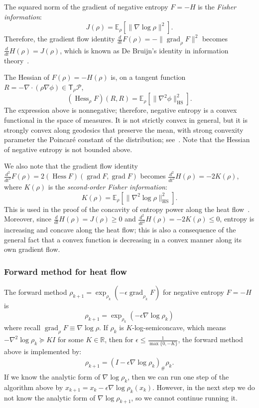 \documentclass[final,12pt]{colt2018}
\newcommand{\R}{\mathbb{R}}
\newcommand{\E}{\mathbb{E}}
\newcommand{\HS}{\mathrm{HS}}
\DeclareMathOperator{\grad}{grad}
\DeclareMathOperator{\Hess}{Hess}
\newcommand{\T}{\mathsf{T}}
\renewcommand{\P}{\mathcal{P}}
\begin{document}
The squared norm of the gradient of negative entropy $F = -H$ is the {\em Fisher information}:
$$J(\rho) = \E_\rho[\|\nabla \log \rho\|^2].$$
Therefore, the gradient flow identity $\frac{d}{dt} F(\rho) = -\|\grad_\rho F\|^2$ becomes $\frac{d}{dt} H(\rho) = J(\rho)$, which is known as De Bruijn's identity in information theory~\cite[]{Sta59}.

The Hessian of $F(\rho) = -H(\rho)$ is, on a tangent function $R = -\nabla \cdot(\rho \nabla \phi) \in \T_\rho \P$,
$$(\Hess_\rho F)(R,R) = \E_\rho[\|\nabla^2 \phi\|^2_{\HS}].$$
The expression above is nonnegative; therefore, negative entropy is a convex functional in the space of measures.
It is not strictly convex in general,
but it is strongly convex along geodesics that preserve the mean, with strong convexity parameter the Poincar\'e constant of the distribution; see~\cite[Corollary~2.5]{CG03}.
Note that the Hessian of negative entropy is not bounded above.

We also note that the gradient flow identity $\frac{d^2}{dt^2} F(\rho) = 2(\Hess F)(\grad F, \grad F)$ becomes $\frac{d^2}{dt^2} H(\rho) = -2K(\rho)$, where $K(\rho)$ is the {\em second-order Fisher information}:
$$K(\rho) = \E_\rho[\|\nabla^2 \log \rho\|^2_{\HS}].$$
This is used in the proof of the concavity of entropy power along the heat flow~\cite[]{Dembo91,Vil00}.
Moreover, since $\frac{d}{dt} H(\rho) = J(\rho) \ge 0$ and $\frac{d^2}{dt^2} H(\rho) = -2K(\rho) \le 0$,
entropy is increasing and concave along the heat flow;
this is also a consequence of the general fact that a convex function is decreasing in a convex manner along its own gradient flow.


\subsubsection{Forward method for heat flow}
\label{Sec:FwHeat}

The forward method $\rho_{k+1} = \exp_{\rho_k}(-\epsilon \grad_{\rho_k} F)$ for negative entropy $F = -H$ is
$$\rho_{k+1} = \exp_{\rho_k}(-\epsilon \nabla \log \rho_k)$$
where recall $\grad_\rho F \equiv \nabla \log \rho$.
If $\rho_k$ is $K$-log-semiconcave, which means $-\nabla^2 \log \rho_k \succeq KI$ for some $K \in \R$, then for $\epsilon \le \frac{1}{\max\{0,-K\}}$, the forward method above is implemented by:
\begin{align}\label{Eq:FwHeat}
\rho_{k+1} = (I - \epsilon \nabla \log \rho_k)_\# \rho_k.
\end{align}
If we know the analytic form of $\nabla \log \rho_k$, then we can run one step of the algorithm above by $x_{k+1} = x_k - \epsilon \nabla \log \rho_k(x_k)$.
However, in the next step we do not know the analytic form of $\nabla \log \rho_{k+1}$, so we cannot continue running it.
\end{document}
